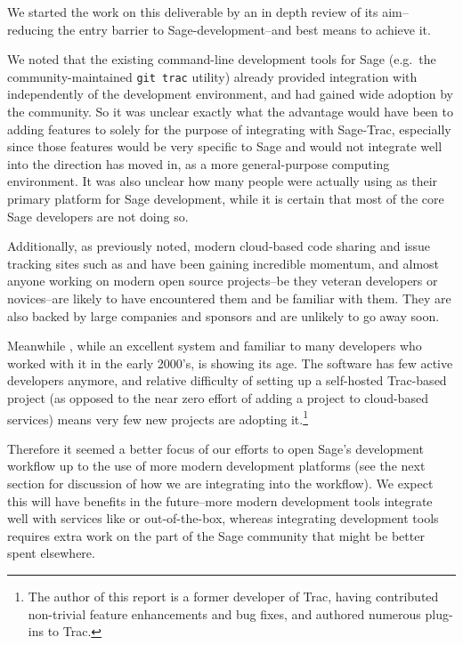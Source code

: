 We started the work on this deliverable by an in depth review of its aim--
reducing the entry barrier to Sage-development--and best means to achieve it.

We noted that the existing command-line development tools for Sage (e.g.~the
community-maintained {\tt git trac} utility) already provided integration with
\Trac independently of the development environment, and had gained wide
adoption by the community. So it was unclear exactly what the advantage would
have been to adding features to \cocalc solely for the purpose of integrating
with Sage-Trac, especially since those features would be very specific to Sage
and would not integrate well into the direction \cocalc has moved in, as a more
general-purpose computing environment.  It was also unclear how many people
were actually using \cocalc as their primary platform for Sage development,
while it is certain that most of the core Sage developers are not doing so.

Additionally, as previously noted, modern cloud-based code sharing and issue
tracking sites such as \GitHub and \GitLab have been gaining incredible
momentum, and almost anyone working on modern open source projects--be they
veteran developers or novices--are likely to have encountered them and be
familiar with them.  They are also backed by large companies and sponsors and
are unlikely to go away soon.

Meanwhile \Trac, while an excellent system and familiar to many developers who
worked with it in the early 2000's, is showing its age.  The \Trac software has
few active developers anymore, and relative difficulty of setting up a
self-hosted Trac-based project (as opposed to the near zero effort of adding a
project to cloud-based services) means very few new projects are adopting
it.\footnote{The author of this report is a former developer of Trac, having
contributed non-trivial feature enhancements and bug fixes, and authored
numerous plug-ins to Trac.}

Therefore it seemed a better focus of our efforts to open Sage's development
workflow up to the use of more modern development platforms (see the next
section for discussion of how we are integrating \GitLab into the workflow).
We expect this will have benefits in the future--more modern development tools
integrate well with services like \GitHub or \GitLab out-of-the-box, whereas
integrating development tools \Trac requires extra work on the part of the Sage
community that might be better spent elsewhere.

